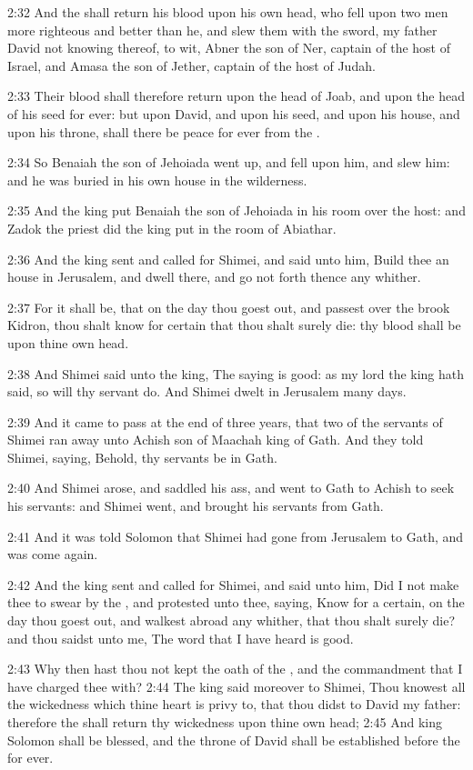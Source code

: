 2:32 And the \LORD shall return his blood upon his own head, who fell upon two men more righteous and better than he, and slew them with the sword, my father David not knowing thereof, to wit, Abner the son of Ner, captain of the host of Israel, and Amasa the son of Jether, captain of the host of Judah.

2:33 Their blood shall therefore return upon the head of Joab, and upon the head of his seed for ever: but upon David, and upon his seed, and upon his house, and upon his throne, shall there be peace for ever from the \LORD.

2:34 So Benaiah the son of Jehoiada went up, and fell upon him, and slew him: and he was buried in his own house in the wilderness.

2:35 And the king put Benaiah the son of Jehoiada in his room over the host: and Zadok the priest did the king put in the room of Abiathar.

2:36 And the king sent and called for Shimei, and said unto him, Build thee an house in Jerusalem, and dwell there, and go not forth thence any whither.

2:37 For it shall be, that on the day thou goest out, and passest over the brook Kidron, thou shalt know for certain that thou shalt surely die: thy blood shall be upon thine own head.

2:38 And Shimei said unto the king, The saying is good: as my lord the king hath said, so will thy servant do. And Shimei dwelt in Jerusalem many days.

2:39 And it came to pass at the end of three years, that two of the servants of Shimei ran away unto Achish son of Maachah king of Gath.  And they told Shimei, saying, Behold, thy servants be in Gath.

2:40 And Shimei arose, and saddled his ass, and went to Gath to Achish to seek his servants: and Shimei went, and brought his servants from Gath.

2:41 And it was told Solomon that Shimei had gone from Jerusalem to Gath, and was come again.

2:42 And the king sent and called for Shimei, and said unto him, Did I not make thee to swear by the \LORD, and protested unto thee, saying, Know for a certain, on the day thou goest out, and walkest abroad any whither, that thou shalt surely die? and thou saidst unto me, The word that I have heard is good.

2:43 Why then hast thou not kept the oath of the \LORD, and the commandment that I have charged thee with?  2:44 The king said moreover to Shimei, Thou knowest all the wickedness which thine heart is privy to, that thou didst to David my father: therefore the \LORD shall return thy wickedness upon thine own head; 2:45 And king Solomon shall be blessed, and the throne of David shall be established before the \LORD for ever.


